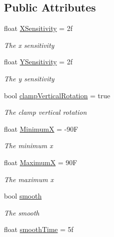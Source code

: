 \subsection*{Public Attributes}
\begin{DoxyCompactItemize}
\item 
float \hyperlink{class_lerp2_assets_1_1_characters_1_1_first_person_1_1_mouse_look_a458be40fb8334bbdf67a9cf7363de25f}{X\+Sensitivity} = 2f
\begin{DoxyCompactList}\small\item\em The x sensitivity \end{DoxyCompactList}\item 
float \hyperlink{class_lerp2_assets_1_1_characters_1_1_first_person_1_1_mouse_look_af055db3a223fab3158e245db34f1fc80}{Y\+Sensitivity} = 2f
\begin{DoxyCompactList}\small\item\em The y sensitivity \end{DoxyCompactList}\item 
bool \hyperlink{class_lerp2_assets_1_1_characters_1_1_first_person_1_1_mouse_look_aa4d83b6674d8dc47568a09f3a017d1c7}{clamp\+Vertical\+Rotation} = true
\begin{DoxyCompactList}\small\item\em The clamp vertical rotation \end{DoxyCompactList}\item 
float \hyperlink{class_lerp2_assets_1_1_characters_1_1_first_person_1_1_mouse_look_a44b2d485a012cc641af3463d41968be4}{MinimumX} = -\/90F
\begin{DoxyCompactList}\small\item\em The minimum x \end{DoxyCompactList}\item 
float \hyperlink{class_lerp2_assets_1_1_characters_1_1_first_person_1_1_mouse_look_a8683b627b05be3daf36618366b401ee2}{MaximumX} = 90F
\begin{DoxyCompactList}\small\item\em The maximum x \end{DoxyCompactList}\item 
bool \hyperlink{class_lerp2_assets_1_1_characters_1_1_first_person_1_1_mouse_look_a82c5440e037e19e77faa4a9a13ee8ddd}{smooth}
\begin{DoxyCompactList}\small\item\em The smooth \end{DoxyCompactList}\item 
float \hyperlink{class_lerp2_assets_1_1_characters_1_1_first_person_1_1_mouse_look_acc627b1d882babd9c1d4ecf8988ea552}{smooth\+Time} = 5f

\end{DoxyCompactItemize}
